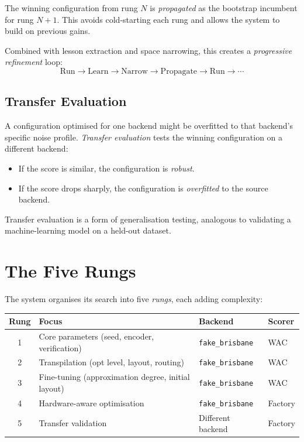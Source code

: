 \documentclass[11pt,a4paper,twoside]{report}
\theoremstyle{definition}
\newcommand{\code}[1]{\texttt{#1}}
\begin{document}
The winning configuration from rung $N$ is \emph{propagated} as the
bootstrap incumbent for rung $N+1$. This avoids cold-starting each rung
and allows the system to build on previous gains.

Combined with lesson extraction and space narrowing, this creates a
\emph{progressive refinement} loop:
\[
  \text{Run} \to \text{Learn} \to \text{Narrow} \to \text{Propagate}
  \to \text{Run} \to \cdots
\]

\section{Transfer Evaluation}

A configuration optimised for one backend might be overfitted to that
backend's specific noise profile. \emph{Transfer evaluation} tests the
winning configuration on a different backend:

\begin{itemize}
  \item If the score is similar, the configuration is \emph{robust}.
  \item If the score drops sharply, the configuration is
        \emph{overfitted} to the source backend.
\end{itemize}

Transfer evaluation is a form of generalisation testing, analogous to
validating a machine-learning model on a held-out dataset.

\chapter{The Five Rungs}
\label{ch:rungs}

The system organises its search into five \emph{rungs}, each adding
complexity:

\begin{center}
\renewcommand{\arraystretch}{1.4}
\begin{tabular}{clll}
\toprule
\textbf{Rung} & \textbf{Focus} & \textbf{Backend} & \textbf{Scorer} \\
\midrule
1 & Core parameters (seed, encoder, verification) &
    \code{fake\_brisbane} & WAC \\
2 & Transpilation (opt level, layout, routing) &
    \code{fake\_brisbane} & WAC \\
3 & Fine-tuning (approximation degree, initial layout) &
    \code{fake\_brisbane} & WAC \\
4 & Hardware-aware optimisation &
    \code{fake\_brisbane} & Factory \\
5 & Transfer validation &
    Different backend & Factory \\
\bottomrule
\end{tabular}
\end{center}
\end{document}
